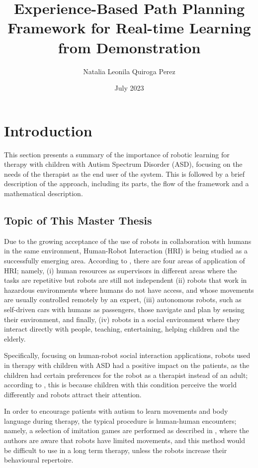 \documentclass[thesis]{mas_proposal}
\title{Experience-Based Path Planning Framework for Real-time Learning from Demonstration}
\author{Natalia Leonila Quiroga Perez}
\date{July 2023}
\begin{document}
\maketitle

\pagestyle{plain}

\section{Introduction}

	This section presents a summary of the importance of robotic learning for therapy with children with Autism Spectrum Disorder (ASD), focusing on the needs of the therapist as the end user of the system. This is followed by a brief description of the approach, including its parts, the flow of the framework and a mathematical description.
	
	\subsection{Topic of This Master Thesis}

    Due to the growing acceptance of the use of robots in collaboration with humans in the same environment, Human-Robot Interaction (HRI) is being studied as a successfully emerging area. According to \cite{Sheridan2016}, there are four areas of application of HRI; namely, (i) human resources as supervisors in different areas where the tasks are repetitive but robots are still not independent (ii) robots that work in hazardous environments where humans do not have access, and whose movements are usually controlled remotely by an expert, (iii) autonomous robots, such as self-driven cars with humans as passengers, those navigate and plan by sensing their environment, and finally, (iv) robots in a social environment where they interact directly with people, teaching, entertaining, helping children and the elderly.
    
    Specifically, focusing on human-robot social interaction applications, robots used in therapy with children with ASD had a positive impact on the patients, as the children had certain preferences for the robot as a therapist instead of an adult; according to \cite{Prabha2019}, this is because children with this condition perceive the world differently and robots attract their attention.
    
    In order to encourage patients with autism to learn movements and body language during therapy, the typical procedure is human-human encounters; namely, a selection of imitation games are performed as described in \cite{Dautenhahn2004}, where the authors are aware that robots have limited movements, and this method would be difficult to use in a long term therapy, unless the robots increase their behavioural repertoire.
    
\end{document}
